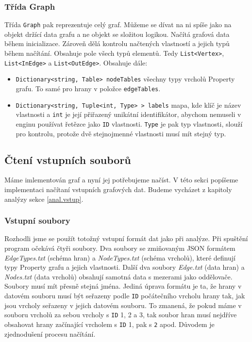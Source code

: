 \subsubsection{Třída Graph}

Třída \texttt{Graph} pak reprezentuje celý graf.
Můžeme se dívat na ni spíše jako na objekt držící data grafu a ne objekt se složitou logikou.
Načítá grafová data během inicializace.
Zároveň dělá kontrolu načtených vlastností a jejich typů během načítání.
Obsahuje pole všech typů elementů. Tedy \texttt{List<Vertex>}, \texttt{List<InEdge>} a \texttt{List<OutEdge>}.
Obsahuje dále:
\begin{itemize}
\item \texttt{Dictionary<string, Table> nodeTables} všechny typy vrcholů Property grafu. To samé pro hrany v položce \texttt{edgeTables}.
\item \texttt{Dictionary<string, Tuple<int, Type> > labels} mapa, kde klíč je název vlastnosti a \texttt{int} je její přiřazený unikátní identifikátor, abychom nemuseli v enginu používat řetězce jako \texttt{ID} vlastnosti.
\texttt{Type} je pak typ vlastnosti, slouží pro kontrolu, protože dvě stejnojmenné vlastnosti musí mít stejný typ. 
\end{itemize}


\subsection{Čtení vstupních souborů} \label{impl.vstup}

Máme imlementován graf a nyní jej potřebujeme načíst.
V této sekci popíšeme implementaci načítaní vstupních grafových dat.
Budeme vycházet z kapitoly analýzy sekce \ref{anal.vstup}.

\subsubsection{Vstupní soubory}

Rozhodli jsme se použít totožný vstupní formát dat jako při analýze.
Při spuštění program očekává čtyři soubory.
Dva soubory se zmiňovaným JSON formátem \textit{EdgeTypes.txt} (schéma hran) a \textit{NodeTypes.txt} (schéma vrcholů), které definují typy Property grafu a jejich vlastnosti.
Další dva soubory \textit{Edge.txt} (data hran) a \textit{Nodes.txt} (data vrcholů) obsahují samotná data s mezerami jako oddělovače.
Soubory musí mít přesně stejná jména.
Jediná úprava formátu je ta, že hrany v datovém souboru musí být seřazeny podle \texttt{ID} počátečního vrcholu hrany tak, jak jsou vrcholy seřazeny v jejich datovém souboru.
To zmanená, že pokud máme v souboru vrcholů za sebou vrcholy s \texttt{ID} 1, 2 a 3, tak soubor hran musí nejdříve obsahovat hrany začínající vrcholem s \texttt{ID} 1, pak s \texttt{2} apod.
Důvodem je zjednodušení procesu načítání.

